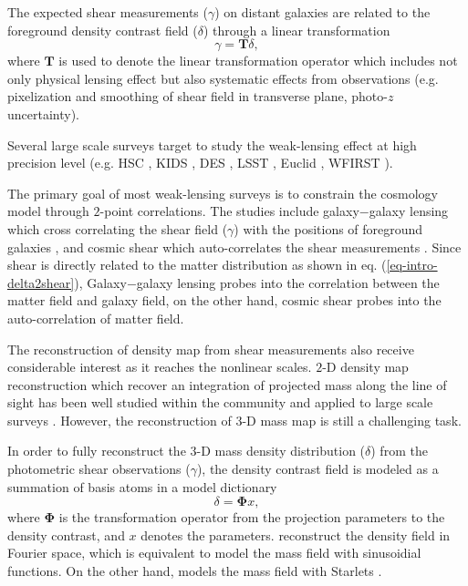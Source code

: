 \documentclass[twocolumn]{aastex62}
\begin{document}
The expected shear measurements ($\gamma$) on distant galaxies are related to the
foreground density contrast field ($\delta$) through a linear transformation
\begin{equation} \label{eq-intro-delta2shear}
 \gamma=\mathbf{T} \delta,
\end{equation}
where $\mathbf{T}$ is used to denote the linear transformation operator which includes not only physical lensing effect
but also systematic effects from observations (e.g. pixelization and smoothing of shear field in
transverse plane, photo-$z$ uncertainty).

Several large scale surveys target to study the weak-lensing effect at high precision level (e.g. HSC \citep{HSC1-data}, KIDS
\citep{KIDS13}, DES \citep{DES05}, LSST \citep{LSSTScienceBook}, Euclid \citep{Euclid2011}, WFIRST \citep{WFIRST15}).

The primary goal of most weak-lensing surveys is to constrain the cosmology model through $2$-point correlations. The studies
include galaxy$-$galaxy lensing which cross correlating the shear field ($\gamma$) with the positions of foreground galaxies
\citep{gglens-GAMA-Han2014,gglens-BossCFHTMore2015,gglens-DES1},
and cosmic shear which auto-correlates the shear measurements
\citep{cosmicShearRealKids450,cosmicShear-DES1,cosmicShear_HSC1_Chiaki2019,cosmicShear_HSC1_Hamana2019}.
Since shear is directly related to the matter distribution as shown in eq. (\ref{eq-intro-delta2shear}), Galaxy$-$galaxy lensing
probes into the correlation between the matter field and galaxy field, on the other hand, cosmic shear probes into the
auto-correlation of matter field.

The reconstruction of density map from shear measurements also receive considerable interest as it reaches the nonlinear scales.
$2$-D density map reconstruction which recover an integration of projected mass along the line of sight has been well studied
within the community \citep{massMap-KS1993,WL-massMap-Glimpse2D-Lanusse2016,sparseBaysianMassMap-Price2020}
and applied to large scale surveys \citep{HSC1-massMaps,massMapDES-Chang2018,DES-SV-massMap-sparsity}. However, the
reconstruction of $3$-D mass map is still a challenging task.

In order to fully reconstruct the $3$-D mass density distribution ($\delta$) from the photometric shear observations ($\gamma$),
the density contrast field is modeled as a summation of basis atoms in a model dictionary
\begin{equation} \label{eq-intro-dict}
 \delta= \mathbf{\Phi} x,
\end{equation}
where $\mathbf{\Phi}$ is the transformation operator from the projection parameters to the density contrast,
and $x$ denotes the parameters. \citet{LSS-massMap-Wiener-Simon2009} reconstruct the density field
in Fourier space, which is equivalent to model the mass field with sinusoidial functions. On the other hand,
\citet{LSS-massMap-Glimpse3D-Leonard2014} models the mass field with Starlets \citep{Starlet-Starck2015}.
\end{document}
